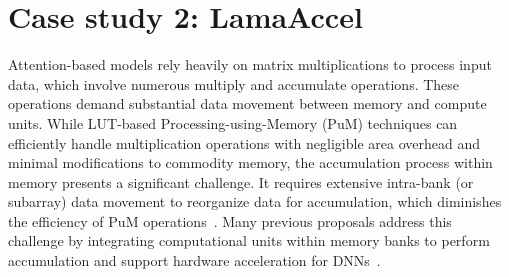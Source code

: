 








\section{Case study 2: LamaAccel}
Attention-based models rely heavily on matrix multiplications to process input data, which involve numerous multiply and accumulate operations. These operations demand substantial data movement between memory and compute units. While LUT-based Processing-using-Memory (PuM) techniques can efficiently handle multiplication operations with negligible area overhead and minimal modifications to commodity memory, the accumulation process within memory presents a significant challenge. It requires extensive intra-bank (or subarray) data movement to reorganize data for accumulation, which diminishes the efficiency of PuM operations~\cite{transpim}. Many previous proposals address this challenge by integrating computational units within memory banks to perform accumulation and support hardware acceleration for DNNs~\cite{transpim,fulcrum,sal-pim}.

